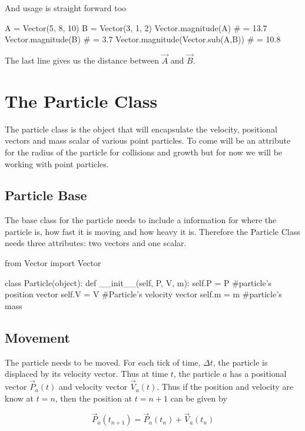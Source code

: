 \documentclass[15pt]{report}
\begin{document}
And usage is straight forward too

\begin{code}
A = Vector(5, 8, 10)
B = Vector(3, 1, 2)
Vector.magnitude(A)                     # = 13.7
Vector.magnitude(B)                     # = 3.7
Vector.magnitude(Vector.sub(A,B))       # = 10.8
\end{code}

The last line gives us the distance between $\vec{A}$ and $\vec{B}$.

\section{The Particle Class}
The particle class is the object that will encapsulate the velocity, positional vectors and mass scalar of various point particles. To come will be an attribute for the radius of the particle for collisions and growth but for now we will be working with point particles.

\subsection{Particle Base} The base class for the particle needs to include a information for where the particle is, how fast it is moving and how heavy it is. Therefore the Particle Class needs three attributes: two vectors and one scalar.

\begin{code}
from Vector import Vector

class Particle(object):
    def __init__(self, P, V, m):
        self.P = P        #particle's position vector
        self.V = V        #Particle's velocity vector
        self.m = m        #particle's mass
\end{code}

\subsection{Movement} The particle needs to be moved. For each tick of time, $\Delta t$, the particle is displaced by its velocity vector. Thus at time $t$, the particle $a$ has a positional vector $\vec{P}_{a}(t)$ and velocity vector $\vec{V}_{a}(t)$. Thus if the position and velocity are know at $t=n$, then the position at $t = n+1$ can be given by

\begin{equation}
 \vec{P}_a (t_{n+1}) = \vec{P}_{a}(t_n) + \vec{V}_a (t_n)
\end{equation}
\end{document}
